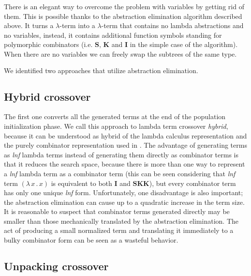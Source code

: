 \documentclass{sig-alternate}
\newcommand{\lterm}{$\lambda$-term\xspace}
\newcommand{\lamb}[2]{( \lambda \, #1 \, . \, #2 )}
\newcommand{\Scomb }{\mathbf{S}}
\newcommand{\Kcomb }{\mathbf{K}}
\newcommand{\Icomb }{\mathbf{I}}
\newcommand{\lnf}{\textit{lnf}\xspace}
\begin{document}
There is an elegant way to overcome the problem with variables by getting rid of them.
This is possible thanks to the abstraction elimination algorithm described above.
It turns a \lterm into a \lterm that contains no lambda abstractions
and no variables, instead, it contains additional function symbols standing for 
polymorphic combinators (i.e. $\Scomb$, $\Kcomb$ and $\Icomb$ 
in the simple case of the algorithm). When there are no variables
we can freely swap the subtrees of the same type.

We identified two approaches that utilize abstraction elimination.

\subsection{Hybrid crossover}

The first one converts all the generated terms at the end of the population initialization phase. We call this approach to lambda term crossover 
\textit{hybrid}, because it can be understood as hybrid of the
lambda calculus representation and the purely combinator representation
used in \cite{kes}. The advantage of generating terms as \lnf lambda terms
instead of generating them directly as combinator terms is that it reduces
the search space, because there is more than one way to represent a \lnf 
lambda term as a combinator term (this can be seen considering that 
\lnf term $\lamb{x}{x}$ is equivalent to both $\Icomb$ and 
$\Scomb \Kcomb \Kcomb$), but every combinator term has only 
one unique \lnf form. Unfortunately, one disadvantage is also important;
the abstraction elimination can cause up to a quadratic 
increase in the term size. It is reasonable to suspect that combinator
terms generated directly may be smaller than those mechanically
translated by the abstraction elimination. 
The act of producing a small normalized term and translating it
immediately to a bulky combinator form can be seen as a wasteful behavior.

\subsection{Unpacking crossover}
\end{document}
